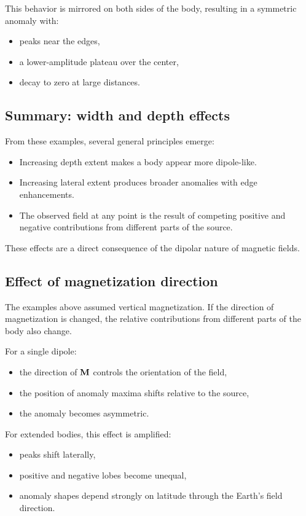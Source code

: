 This behavior is mirrored on both sides of the body, resulting in a symmetric anomaly with:
\begin{itemize}
    \item peaks near the edges,
    \item a lower-amplitude plateau over the center,
    \item decay to zero at large distances.
\end{itemize}

\subsection{Summary: width and depth effects}

From these examples, several general principles emerge:

\begin{itemize}
    \item Increasing depth extent makes a body appear more dipole-like.
    \item Increasing lateral extent produces broader anomalies with edge enhancements.
    \item The observed field at any point is the result of competing positive and negative contributions from different parts of the source.
\end{itemize}

These effects are a direct consequence of the dipolar nature of magnetic fields.

\subsection{Effect of magnetization direction}

The examples above assumed vertical magnetization. If the direction of magnetization is changed, the relative contributions from different parts of the body also change.

For a single dipole:
\begin{itemize}
    \item the direction of $\vb{M}$ controls the orientation of the field,
    \item the position of anomaly maxima shifts relative to the source,
    \item the anomaly becomes asymmetric.
\end{itemize}

For extended bodies, this effect is amplified:
\begin{itemize}
    \item peaks shift laterally,
    \item positive and negative lobes become unequal,
    \item anomaly shapes depend strongly on latitude through the Earth's field direction.
\end{itemize}

